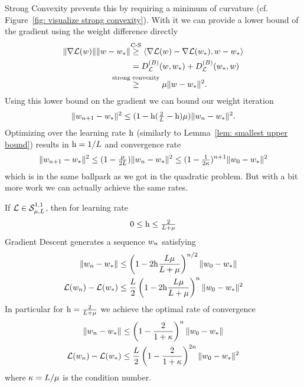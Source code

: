 Strong Convexity prevents this by requiring a minimum of curvature (cf.
Figure~\ref{fig: visualize strong convexity}). With it we can provide a lower
bound of the gradient using the weight difference directly
\begin{align}
	\nonumber
	\|\nabla\Loss(\weights)\|\|\weights -\minimum\|
	&\lxge{\text{C-S}} \langle \nabla\Loss(\weights) -\nabla\Loss(\minimum), \weights - \minimum \rangle\\
	\nonumber
	&= \bregmanDiv{\Loss}(\weights, \minimum) + \bregmanDiv{\Loss}(\minimum, \weights)\\
	\label{eq: strong convexity implies PL}
	&\lxge{\text{strong convexity}} \lbound \|\weights-\minimum\|^2.
\end{align}
Using this lower bound on the gradient we can bound our weight iteration
\begin{align*}
	\|w_{n+1}-w_*\|^2
	\le (1-\text{h}(\tfrac2{L} -\text{h})\mu)\|w_n - w_*\|^2.
\end{align*}
Optimizing over the learning rate \(\text{h}\) (similarly to Lemma~\ref{lem: smallest
upper bound}) results in \(\text{h}=1/L\) and convergence rate
\begin{align*}
	\|w_{n+1}-w_*\|^2
	\le (1-\tfrac{\mu}{2L})\|w_n - w_*\|^2
	\le (1-\tfrac{1}{2\kappa})^{n+1}\|w_0-w_*\|^2
\end{align*}
%
which is in the same ballpark as we got in the quadratic problem. But with a bit
more work we can actually achieve the same rates.
%
\begin{theorem}
	\label{thm: gd strong convexity convergence rate}
	If \(\mathcal{L}\in\mathcal{S}^{1,1}_{{\mu},{L}}\), then for learning rate
	\[0 \le \text{h} \le \tfrac{2}{L+\mu}\]
	Gradient Descent generates a sequence \(w_n\) satisfying
	\begin{subequations}
	\begin{align}
		\label{eq: gd strong convexity convergence rate 1}
		\|w_n - w_*\|
		&\le \left(
			1- 2\text{h}\frac{L\mu}{L+\mu}
		\right)^{n/2}
		\|w_0 - w_*\| \\
		\label{eq: gd strong convexity convergence rate 2}
		\mathcal{L}(w_n) - \mathcal{L}(w_*)
		&\le \frac{L}{2} \left(
			1- 2\text{h}\frac{L\mu}{L+\mu}
		\right)^{n}
		\|w_0 - w_*\|^2
	\end{align}
	\end{subequations}
	In particular for \(\text{h}=\tfrac2{L+\mu}\) we achieve the optimal
	rate of convergence
	\begin{subequations}\label{eq: gd strong convexity optimal rate}
	\begin{align}
		\|w_n - w_*\|
		&\le \left(
			1- \frac{2}{1+\kappa}
		\right)^n
		\|w_0 - w_*\| \\
		\mathcal{L}(w_n) - \mathcal{L}(w_*)
		&\le \frac{L}{2} \left(
			1- \frac{2}{1+\kappa}
		\right)^{2n}
		\|w_0 - w_*\|^2
	\end{align}
	\end{subequations}
	where \(\kappa=L/\mu\) is the condition number.
\end{theorem}
